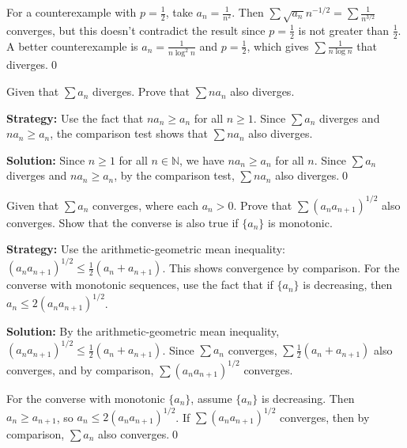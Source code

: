 For a counterexample with \(p = \frac{1}{2}\), take \(a_n = \frac{1}{n^2}\). Then \(\sum \sqrt{a_n} n^{-1/2} = \sum \frac{1}{n^{3/2}}\) converges, but this doesn't contradict the result since \(p = \frac{1}{2}\) is not greater than \(\frac{1}{2}\). A better counterexample is \(a_n = \frac{1}{n \log^2 n}\) and \(p = \frac{1}{2}\), which gives \(\sum \frac{1}{n \log n}\) that diverges.\qed



\begin{problembox}
\begin{problemstatement}
Given that \(\sum a_n\) diverges. Prove that \(\sum n a_n\) also diverges.
\end{problemstatement}
\end{problembox}

\noindent\textbf{Strategy:} Use the fact that \(n a_n \geq a_n\) for all \(n \geq 1\). Since \(\sum a_n\) diverges and \(n a_n \geq a_n\), the comparison test shows that \(\sum n a_n\) also diverges.

\bigskip\noindent\textbf{Solution:}
Since \(n \geq 1\) for all \(n \in \mathbb{N}\), we have \(n a_n \geq a_n\) for all \(n\). Since \(\sum a_n\) diverges and \(n a_n \geq a_n\), by the comparison test, \(\sum n a_n\) also diverges.\qed



\begin{problembox}
\begin{problemstatement}
Given that \(\sum a_n\) converges, where each \(a_n > 0\). Prove that \(\sum (a_n a_{n+1})^{1/2}\) also converges. Show that the converse is also true if \(\{a_n\}\) is monotonic.
\end{problemstatement}
\end{problembox}

\noindent\textbf{Strategy:} Use the arithmetic-geometric mean inequality: \((a_n a_{n+1})^{1/2} \leq \frac{1}{2}(a_n + a_{n+1})\). This shows convergence by comparison. For the converse with monotonic sequences, use the fact that if \(\{a_n\}\) is decreasing, then \(a_n \leq 2(a_n a_{n+1})^{1/2}\).

\bigskip\noindent\textbf{Solution:}
By the arithmetic-geometric mean inequality, \((a_n a_{n+1})^{1/2} \leq \frac{1}{2}(a_n + a_{n+1})\). Since \(\sum a_n\) converges, \(\sum \frac{1}{2}(a_n + a_{n+1})\) also converges, and by comparison, \(\sum (a_n a_{n+1})^{1/2}\) converges.

For the converse with monotonic \(\{a_n\}\), assume \(\{a_n\}\) is decreasing. Then \(a_n \geq a_{n+1}\), so \(a_n \leq 2(a_n a_{n+1})^{1/2}\). If \(\sum (a_n a_{n+1})^{1/2}\) converges, then by comparison, \(\sum a_n\) also converges.\qed



